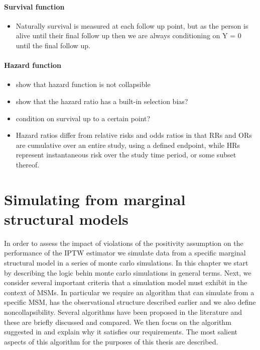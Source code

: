 \documentclass[11pt]{article}
\providecommand{\tightlist}{%
      \setlength{\itemsep}{0pt}\setlength{\parskip}{0pt}}
\begin{document}
\paragraph{Survival function}\label{survival-function}

\begin{itemize}
\tightlist
\item
  Naturally survival is measured at each follow up point, but as the
  person is alive until their final follow up then we are always
  conditioning on Y = 0 until the final follow up.
\end{itemize}

\paragraph{Hazard function}\label{hazard-function}

\begin{itemize}
\tightlist
\item
  show that hazard function is not collapsible
\item
  show that the hazard ratio has a built-in selection bias?
\item
  condition on survival up to a certain point?
\item
  Hazard ratios differ from relative risks and odds ratios in that RRs
  and ORs are cumulative over an entire study, using a defined endpoint,
  while HRs represent instantaneous risk over the study time period, or
  some subset thereof.
\end{itemize}

    \newpage

    \section{Simulating from marginal structural
models}\label{simulating-from-marginal-structural-models}

In order to assess the impact of violations of the positivity assumption
on the performance of the IPTW estimator we simulate data from a
specific marginal structural model in a series of monte carlo
simulations. In this chapter we start by describing the logic behin
monte carlo simulations in general terms. Next, we consider several
important criteria that a simulation model must exhibit in the context
of MSMs. In particular we require an algorithm that can simulate from a
specific MSM, has the observational structure described earlier and we
also define noncollapsibility. Several algorithms have been proposed in
the literature and these are briefly discussed and compared. We then
focus on the algorithm suggested in \citet{Havercroft2010} and explain
why it satisfies our requirements. The most salient aspects of this
algorithm for the purposes of this thesis are described.
\end{document}
